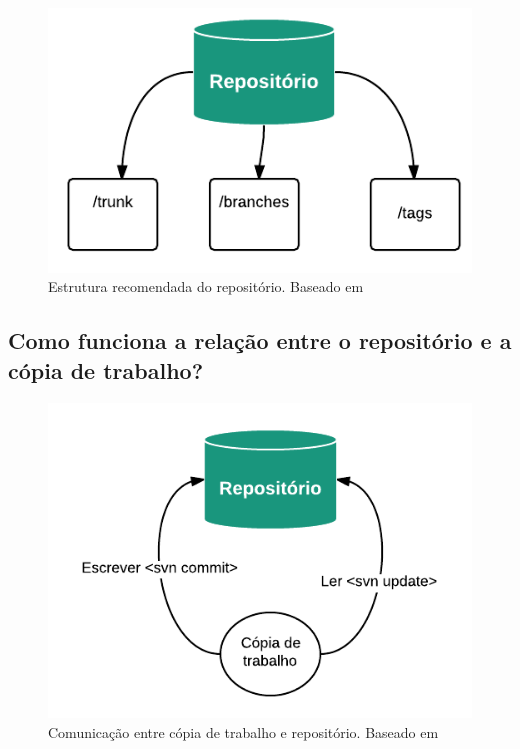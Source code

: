 \begin{figure}[!htb]
\label{estrutura_repo}
\centering
\includegraphics[scale=1]{figuras/estrutura_repo.png}
\caption{Estrutura recomendada do repositório. Baseado em \cite{svn-book}}
\end{figure}


\pagebreak

\subsection{Como funciona a relação entre o repositório e a cópia de trabalho?}

\begin{figure}[!htb]
\centering
\includegraphics[scale=1]{figuras/repositorio_copia.png}
\caption{Comunicação entre cópia de trabalho e repositório. Baseado em \cite{svn-book}}
\end{figure}


